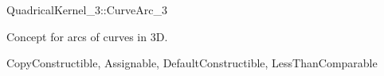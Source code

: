 \begin{ccRefConcept}{QuadricalKernel_3::CurveArc_3}

Concept for arcs of curves in 3D.

\ccRefines
CopyConstructible, Assignable, DefaultConstructible, LessThanComparable



\end{ccRefConcept}
